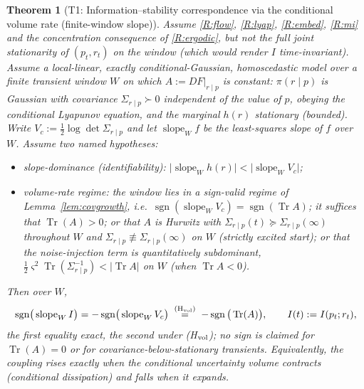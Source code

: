 \documentclass[11pt]{article}
\theoremstyle{plain}
\newtheorem{theorem}{Theorem}[section]
\theoremstyle{definition}
\theoremstyle{remark}
\newcommand{\Sst}{\Sigma_{r\mid p}(\infty)}
\begin{document}
\begin{theorem}[T1: Information--stability correspondence via the conditional volume rate (finite-window slope)]\label{thm:t1}
Assume \ref{R:flow}, \ref{R:lyap}, \ref{R:embed}, \ref{R:mi} and the concentration consequence of \ref{R:ergodic}, but \emph{not} the full joint stationarity of $(p_t,r_t)$ on the window (which would render $I$ time-invariant). Assume a \emph{local-linear, exactly conditional-Gaussian, homoscedastic} model over a finite transient window $W$ on which $A:=DF|_{r\mid p}$ is constant: $\pi(r\mid p)$ is Gaussian with covariance $\Sigma_{r\mid p}\succ0$ \emph{independent of the value of $p$}, obeying the conditional Lyapunov equation, and the marginal $h(r)$ stationary (bounded). Write $V_c:=\tfrac12\log\det\Sigma_{r\mid p}$ and let $\operatorname{slope}_W f$ be the least-squares slope of $f$ over $W$. Assume two named hypotheses:
\begin{itemize}[leftmargin=2.4em]
\item[\textnormal{(D)}] \emph{slope-dominance (identifiability):} $\big|\operatorname{slope}_W h(r)\big|<\big|\operatorname{slope}_W V_c\big|$;
\item[\textnormal{(H$_{\rm vol}$)}] \emph{volume-rate regime:} the window lies in a sign-valid regime of Lemma~\ref{lem:covgrowth}, i.e.\ $\operatorname{sgn}(\operatorname{slope}_W V_c)=\operatorname{sgn}(\operatorname{Tr}A)$; it suffices that $\operatorname{Tr}(A)>0$; or that $A$ is Hurwitz with $\Sigma_{r\mid p}(t)\succeq\Sst$ throughout $W$ and $\Sigma_{r\mid p}\not\equiv\Sst$ on $W$ (strictly excited start); or that the noise-injection term is quantitatively subdominant, $\tfrac12\varsigma^2\operatorname{Tr}(\Sigma_{r\mid p}^{-1})<|\operatorname{Tr}A|$ on $W$ (when $\operatorname{Tr}A<0$).
\end{itemize}
Then over $W$,
\[
\operatorname{sgn}\!\big(\operatorname{slope}_W I\big)=-\operatorname{sgn}\!\big(\operatorname{slope}_W V_c\big)\;\overset{\textnormal{(H$_{\rm vol}$)}}{=}\;-\operatorname{sgn}\big(\operatorname{Tr}(A)\big),\qquad I(t):=I(p_t;r_t),
\]
the first equality exact, the second under (H$_{\rm vol}$); no sign is claimed for $\operatorname{Tr}(A)=0$ or for covariance-below-stationary transients. Equivalently, the coupling rises exactly when the conditional uncertainty volume contracts (conditional dissipation) and falls when it expands.
\end{theorem}
\end{document}
